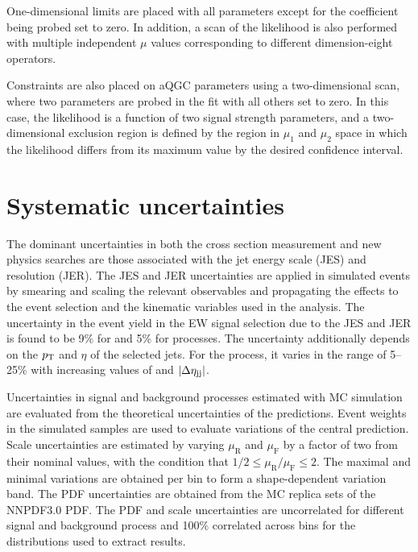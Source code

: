 One-dimensional limits are placed with all
parameters except for the coefficient being probed set to zero.
In addition, a scan of the likelihood is also performed with multiple independent
$\mu$ values corresponding to different dimension-eight operators. 

Constraints are also placed on aQGC parameters using a two-dimensional scan,
where two parameters are probed in the fit with all others set to zero.
In this case, the likelihood is a function of two signal strength parameters,
and a two-dimensional exclusion region is defined by the region
in $\mu_1$ and $\mu_2$ space in which the likelihood differs
from its maximum value by the desired confidence interval.

\section{Systematic uncertainties}
\label{sec:systematics}

The dominant uncertainties in both the cross section measurement 
and new physics searches are those associated with 
the jet energy scale (JES) and resolution (JER).  The JES and JER 
uncertainties are applied in simulated events by smearing and 
scaling the relevant
observables and propagating the effects to the event selection and 
the kinematic variables used in the analysis.
The uncertainty in the event yield in the EW signal selection
due to the JES and JER 
is found to be 9\% for \QCDWZ and 5\% for \EWWZ processes.
The uncertainty additionally depends on the $p_{\mathrm{T}}$ and $\eta$ of the selected
jets. For the \QCDWZ process, it varies in the range of 5--25\% with
increasing values of {\mjj} and $\left|\Delta\eta_{\mathrm{jj}}\right|$.

Uncertainties in signal and background processes estimated with
MC simulation are evaluated from the theoretical uncertainties 
of the predictions. 
Event weights in the simulated samples are used to evaluate 
variations of the central prediction.
Scale uncertainties are estimated by varying
$\mu_{\mathrm{R}}$ and $\mu_{\mathrm{F}}$ by a factor of two from their
nominal values, with the condition that $1/2 \le \mu_{\mathrm{R}}/\mu_{\mathrm{F}} \le 2$.
The maximal and minimal variations are obtained
per bin to form a shape-dependent variation band.
The PDF uncertainties are obtained from the MC replica sets 
of the NNPDF3.0 PDF. 
The PDF and scale uncertainties are uncorrelated for different signal and
background process and 100\% correlated across bins for the distributions
used to extract results.

